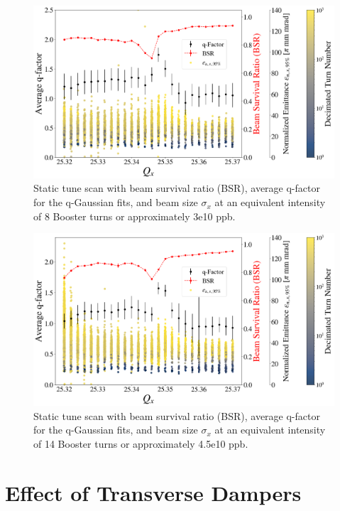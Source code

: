 \begin{figure}[H]
    \centering
    \includegraphics[width=\columnwidth]{chapter6/static8turns_emittance_dampersOFF.png}
    \caption{Static tune scan with beam survival ratio (BSR), average q-factor for the q-Gaussian fits, and beam size $\sigma_x$ at an equivalent intensity of 8 Booster turns or approximately 3e10 ppb.}
    \label{fig:static8_q}
\end{figure}

\begin{figure}[H]
    \centering
    \includegraphics[width=\columnwidth]{chapter6/static14turns_emittance_dampersOFF.png}
    \caption{Static tune scan with beam survival ratio (BSR), average q-factor for the q-Gaussian fits, and beam size $\sigma_x$ at an equivalent intensity of 14 Booster turns or approximately 4.5e10 ppb.}
    \label{fig:static14_q}
\end{figure}

\section{\label{sec:ch6dampers}Effect of Transverse Dampers}

